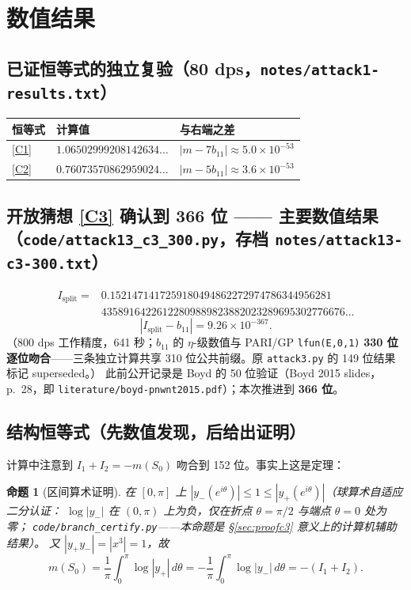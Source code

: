 \documentclass[11pt,a4paper]{ctexart}
\newtheorem{proposition}[theorem]{命题}
\theoremstyle{remark}
\newcommand{\bN}{b_{11}}
\newcommand{\dd}{\,d}
\newcommand{\Isplit}{I_{\mathrm{split}}}
\begin{document}
\section{数值结果}

\subsection{已证恒等式的独立复验（80 dps，\texttt{notes/attack1-results.txt}）}

\begin{center}
\begin{tabular}{@{}lll@{}}
\toprule
恒等式 & 计算值 & 与右端之差 \\
\midrule
\eqref{C1} & $1.06502999208142634\ldots$ & $|m-7\bN|\approx5.0\times10^{-53}$ \\
\eqref{C2} & $0.76073570862959024\ldots$ & $|m-5\bN|\approx3.6\times10^{-53}$ \\
\bottomrule
\end{tabular}
\end{center}

\subsection{开放猜想 \eqref{C3} 确认到 366 位 —— 主要数值结果（\texttt{code/attack13\_c3\_300.py}，存档 \texttt{notes/attack13-c3-300.txt}）}

\[
\begin{split}
\Isplit={}&0.1521471417259180494862272974786344956281\\
&43589164226122809889823882023289695302776676\ldots
\end{split}
\]
\[
|\Isplit-\bN|=9.26\times10^{-367}.
\]
（800 dps 工作精度，641 秒；$\bN$ 的 $\eta$-级数值与 PARI/GP \texttt{lfun(E,0,1)} \textbf{330 位逐位吻合}——三条独立计算共享 310 位公共前缀。原 \texttt{attack3.py} 的 149 位结果标记 superseded。）
此前公开记录是 Boyd 的 50 位验证（Boyd 2015 slides，p.~28，即 \texttt{literature/boyd-pnwnt2015.pdf}）；本次推进到 \textbf{366 位}。

\subsection{结构恒等式（先数值发现，后给出证明）}\label{sec:structure}

计算中注意到 $I_1+I_2=-m(S_0)$ 吻合到 152 位。事实上这是定理：

\begin{proposition}[区间算术证明]\label{prop:structure}
在 $[0,\pi]$ 上 $|y_-(e^{i\theta})|\le1\le|y_+(e^{i\theta})|$（球算术自适应二分认证：
$\log|y_-|$ 在 $(0,\pi)$ 上为负，仅在折点 $\theta=\pi/2$ 与端点 $\theta=0$ 处为零；
\texttt{code/branch\_certify.py}——本命题是 \S\ref{sec:proofc3} 意义上的计算机辅助结果）。
又 $|y_+y_-|=|x^3|=1$，故
\[
m(S_0)=\frac1\pi\int_0^\pi\log|y_+|\dd\theta=-\frac1\pi\int_0^\pi\log|y_-|\dd\theta=-(I_1+I_2).
\]
\end{proposition}
\end{document}
